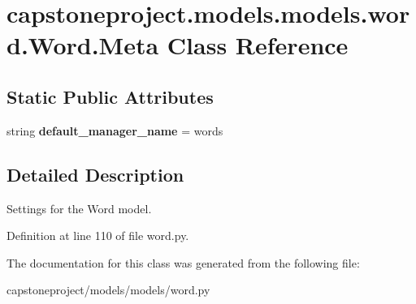 \hypertarget{classcapstoneproject_1_1models_1_1models_1_1word_1_1_word_1_1_meta}{}\section{capstoneproject.\+models.\+models.\+word.\+Word.\+Meta Class Reference}
\label{classcapstoneproject_1_1models_1_1models_1_1word_1_1_word_1_1_meta}
\subsection*{Static Public Attributes}
\begin{DoxyCompactItemize}
\item 
\mbox{\label{classcapstoneproject_1_1models_1_1models_1_1word_1_1_word_1_1_meta_a4d7cc48139f864a1c526030ea5b4b6c9}} 
string {\bfseries default\+\_\+manager\+\_\+name} = \textquotesingle{}words\textquotesingle{}
\end{DoxyCompactItemize}


\subsection{Detailed Description}
\begin{DoxyVerb}Settings for the Word model.\end{DoxyVerb}
 

Definition at line 110 of file word.\+py.



The documentation for this class was generated from the following file\+:\begin{DoxyCompactItemize}
\item 
capstoneproject/models/models/word.\+py\end{DoxyCompactItemize}
